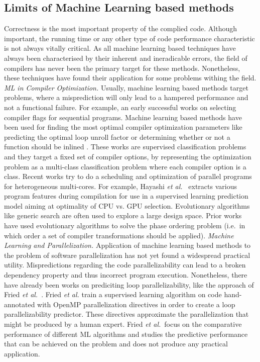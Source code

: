 \subsection{Limits of Machine Learning based methods}
\label{background_challenges_ml}
\quad Correctness is the most important property of the complied code. Although important, the running time or any other type of code performance characteristic is not always vitally critical. As all machine learning based techniques have always been characterised by their inherent and ineradicable errors, the field of compilers has never been the primary target for these methods. Nonetheless, these techniques have found their application for some problems withing the field.\newline\null
\textit{ML in Compiler Optimization.}
Usually, machine learning based methods target problems, where a misprediction will only lead to a hampered performance and not a functional failure. For example, an early successful works on selecting compiler flags for sequential programs. Machine learning based methods have been used for finding the most optimal compiler optimization parameters like predicting the optimal loop unroll factor \cite{4907653,1402082} or determining whether or not a function should be inlined \cite{Zhao2003ToIO,1559966}. These works are supervised classification problems and they target a fixed set of compiler options, by representing the optimization problem as a multi-class classification problem where each compiler option is a class. Recent works try to do a scheduling and optimization of parallel programs for heterogeneous multi-cores. For example, Hayashi \emph{et al.}~\cite{Hayashi:2015:MPH:2807426.2807429} extracts various program features during compilation for use in a supervised learning prediction model aiming at optimality of CPU vs. GPU selection. Evolutionary algorithms like generic search are often used to explore a large design space. Prior works~\cite{Almagor:2004:FEC:997163.997196,Cooper:2005:AAC:1065910.1065921,Ashouri:2017:MMC:3132652.3124452} have used evolutionary algorithms to solve the phase ordering problem (i.e.\ in which order a set of compiler transformations should be applied).\newline\null
\textit{Machine Learning and Parallelization.}
Application of machine learning based methods to the problem of software parallelization has not yet found a widespread practical utility. Mispredictions regarding the code parallelizability can lead to a broken dependency property and thus incorrect program execution. Nonetheless, there have already been works on prediciting loop parallelizability, like the approach of Fried \emph{et al.}~\cite{fried_ea:2013:icmla}. Fried \emph{et al.} train a supervised learning algorithm on code hand-annotated with OpenMP parallelization directives in order to create a loop parallelizability predictor. These directives approximate the parallelization that might be produced by a human expert. Fried \emph{et al.}~focus on the comparative performance of different ML algorithms and studies the predictive performance that can be achieved on the problem and does not produce any practical application.\newline\null
